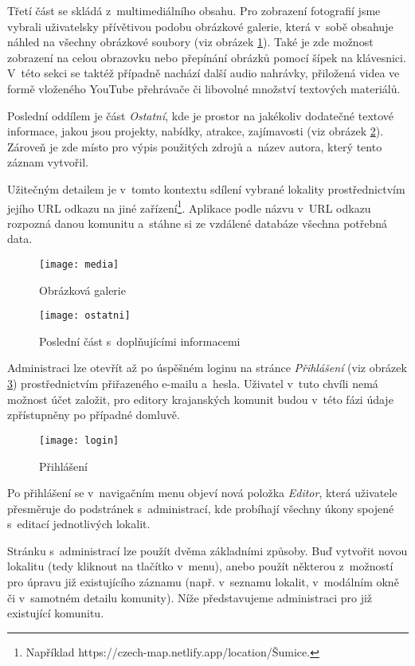 Třetí část se skládá z~multimediálního obsahu. Pro zobrazení fotografií jsme vybrali uživatelsky přívětivou podobu obrázkové galerie, která v~sobě obsahuje náhled na všechny obrázkové soubory (viz obrázek \ref{media}). Také je zde možnost zobrazení na celou obrazovku nebo přepínání obrázků pomocí šípek na klávesnici. V~této sekci se taktéž případně nachází další audio nahrávky, přiložená videa ve formě vloženého YouTube přehrávače či libovolné množství textových materiálů.

Poslední oddílem je část \emph{Ostatní}, kde je prostor na jakékoliv dodatečné textové informace, jakou jsou projekty, nabídky, atrakce, zajímavosti (viz obrázek \ref{ostatni}). Zároveň je zde místo pro výpis použitých zdrojů a~název autora, který tento záznam vytvořil.

Užitečným detailem je v~tomto kontextu sdílení vybrané lokality prostřednictvím jejího URL odkazu na jiné zařízení\footnote{Například https://czech-map.netlify.app/location/Šumice.}. Aplikace podle názvu v~URL odkazu rozpozná danou komunitu a~stáhne si ze vzdálené databáze všechna potřebná data.

\begin{figure}  
    \centering
    \texttt{[image: media]}  
    \caption{Obrázková galerie}
    \label{media}
\end{figure}

\begin{figure} 
    \centering
    \texttt{[image: ostatni]}  
    \caption{Poslední část s~doplňujícími informacemi}
    \label{ostatni}
\end{figure}

Administraci lze otevřít až po úspěšném loginu na stránce \emph{Přihlášení} (viz obrázek \ref{login}) prostřednictvím přiřazeného e-mailu a~hesla. Uživatel v~tuto chvíli nemá možnost účet založit, pro editory krajanských komunit budou v~této fázi údaje zpřístupněny po případné domluvě.

\begin{figure}
    \centering
    \texttt{[image: login]}  
    \caption{Přihlášení}
    \label{login}
\end{figure}

Po přihlášení se v~navigačním menu objeví nová položka \emph{Editor}, která uživatele přesměruje do podstránek s~administrací, kde probíhají všechny úkony spojené s~editací jednotlivých lokalit.

Stránku s~administrací lze použít dvěma základními způsoby. Buď vytvořit novou lokalitu (tedy kliknout na tlačítko v~menu), anebo použít některou z~možností pro úpravu již existujícího záznamu (např. v~seznamu lokalit, v~modálním okně či v~samotném detailu komunity). Níže představujeme administraci pro již existující komunitu.

